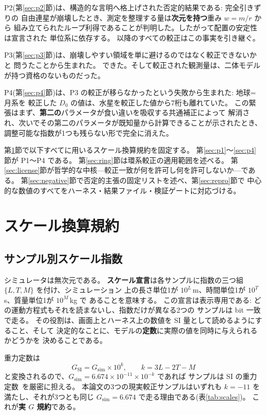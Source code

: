 \documentclass[a4paper,10pt,twocolumn]{ltjsarticle}
\begin{document}
P2(第\ref{sec:p2}節)は、構造的な言明へ格上げされた否定的結果である: 完全引きずりの
自由連星が崩壊したとき、測定を整理する量は\textbf{次元を持つ}重み $w=m/r$ から
組み立てられたループ利得であることが判明した。したがって配置の安定性は宣言された
単位系に依存する。
以降のすべての較正はこの事実を引き継ぐ。

P3(第\ref{sec:p3}節)は、崩壊しやすい領域を単に避けるのではなく較正できないかと
問うたことから生まれた。
できた。そして較正された観測量は、二体モデルが持つ資格のないものだった。

P4(第\ref{sec:p4}節)は、P3 の較正が移らなかったという失敗から生まれた: 地球=月系を
較正した $D_0$ の値は、水星を較正した値から7桁も離れていた。
この緊張はまず、\textbf{第二の}パラメータが食い違いを吸収する共通補正によって
解消され、次いでその第二のパラメータが既知量から計算できることが示されたとき、
調整可能な指数が1つも残らない形で完全に消えた。

第\ref{sec:conv}節で以下すべてに用いるスケール換算規約を固定する。
第\ref{sec:p1}〜\ref{sec:p4}節が P1〜P4 である。
第\ref{sec:ring}節は環系較正の適用範囲を述べる。
第\ref{sec:license}節が哲学的な中核---較正一致が何を許可し何を許可しないか---である。
第\ref{sec:negative}節で否定的主張の固定リストを述べ、第\ref{sec:repro}節で
中心的な数値のすべてをハーネス・結果ファイル・検証ゲートに対応づける。

\section{スケール換算規約}
\label{sec:conv}

\subsection{サンプル別スケール指数}
\label{sec:exponents}

シミュレータは無次元である。
\textbf{スケール宣言}は各サンプルに指数の三つ組 $\{L,T,M\}$ を付け、シミュレーション
上の長さ単位1が $10^{L}$\,m、時間単位1が $10^{T}$\,s、質量単位1が $10^{M}$\,kg で
あることを意味する。
この宣言は表示専用である: どの運動方程式もそれを読まないし、指数だけが異なる2つの
サンプルは bit 一致で走る。
その役割は、画面上とハーネス上の数値を SI 量として読めるようにすること、そして
決定的なことに、モデルの\textbf{定数}に実際の値を同時に与えられるかどうかを
決めることである。

重力定数は
\begin{equation}
  G_{\mathrm{SI}} = G_{\mathrm{sim}}\times10^{k},
  \qquad k = 3L-2T-M
  \label{eq:Gk}
\end{equation}
と変換されるので、$G_{\mathrm{sim}}=6.674\times10^{-11}\times10^{-k}$ であれば
サンプルは SI の重力定数~\cite{CODATA2022}を厳密に担える。
本論文の3つの現実較正サンプルはいずれも $k=-11$ を満たし、それが3つとも同じ
$G_{\mathrm{sim}}=6.674$ で走る理由である(表\ref{tab:scales})。
これが\textbf{実 $G$ 規約}である。
\end{document}
